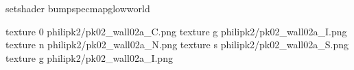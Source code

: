 setshader bumpspecmapglowworld


texture 0 philipk2/pk02_wall02a_C.png
texture g philipk2/pk02_wall02a_I.png
texture n philipk2/pk02_wall02a_N.png
texture s philipk2/pk02_wall02a_S.png
texture g philipk2/pk02_wall02a_I.png

